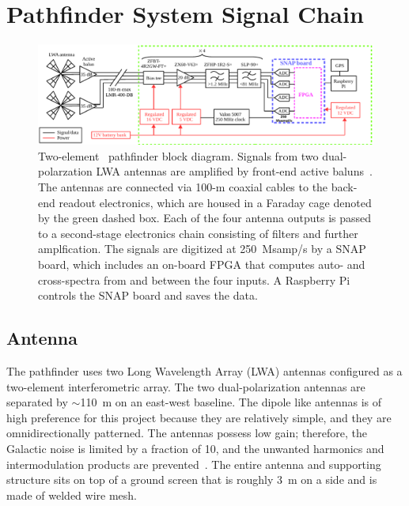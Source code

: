\section{Pathfinder System Signal Chain}

\begin{figure}
	\begin{center} \includegraphics[width=\linewidth]{Figures/pathfinder_schematic.pdf}
		\caption{Two-element \albatros\ pathfinder block diagram.  Signals from two dual-polarzation LWA antennas are amplified by
			front-end active baluns~\citep{2012PASP..124.1090H}. The antennas are connected via 100-m coaxial cables to the back-end readout electronics, which are housed in a Faraday cage denoted by the green dashed box.  Each of the four antenna outputs is passed to a second-stage electronics chain consisting of filters and	further amplfication.  The signals are digitized at 250~Msamp/s by a SNAP board, which includes an on-board FPGA that computes auto- and cross-spectra from and between the four inputs.  A Raspberry Pi controls the SNAP board and saves the data.}
		\label{Fig:albatros2_schem}
	\end{center}
\end{figure}

\subsection{Antenna}\label{s:antenna}

The pathfinder uses two Long Wavelength Array (LWA) antennas configured as a two-element interferometric array. The two dual-polarization antennas are separated by $\sim$\SI{110}{\meter} on an east-west baseline. The dipole like antennas is of high preference for this project because they are relatively simple, and they are omnidirectionally patterned. The antennas possess low gain; therefore, the Galactic noise is limited by a fraction of 10, and the unwanted harmonics and intermodulation products are prevented~\citep{Memo28, Memo27}. The entire antenna and supporting structure sits on top of a ground screen that is roughly \SI{3}{\meter} on a side and is made of welded wire mesh.

